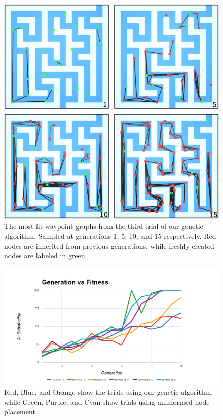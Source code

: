	
	\begin{figure}
		\includegraphics[width=1\columnwidth]{tests/geneticT3b}
		\caption{The most fit waypoint graphs from the third trial of our genetic algorithm. Sampled at generations 1, 5, 10, and 15 respectively. Red nodes are inherited from previous generations, while freshly created nodes are labeled in green.}
	\end{figure}
	
	\begin{figure}
		\includegraphics[width=\textwidth]{tests/genfitness}
		\caption{Red, Blue, and Orange show the trials using our genetic algorithm, while Green, Purple, and Cyan show trials using uninformed node placement.}
	\end{figure}
	
